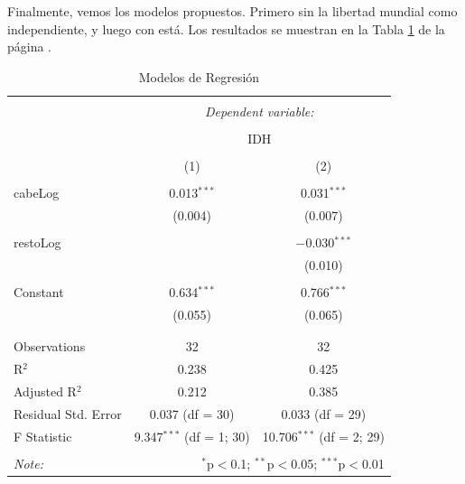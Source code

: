 \documentclass{article}
\begin{document}
Finalmente, vemos los modelos propuestos. Primero sin la libertad mundial como independiente, y luego con está. Los resultados se muestran en la Tabla \ref{regresiones} de la página \pageref{regresiones}.



\begin{table}[!htbp] \centering 
  \caption{Modelos de Regresión} 
  \label{regresiones} 
\begin{tabular}{@{\extracolsep{5pt}}lcc} 
\\[-1.8ex]\hline 
\hline \\[-1.8ex] 
 & \multicolumn{2}{c}{\textit{Dependent variable:}} \\ 
\cline{2-3} 
\\[-1.8ex] & \multicolumn{2}{c}{IDH} \\ 
\\[-1.8ex] & (1) & (2)\\ 
\hline \\[-1.8ex] 
 cabeLog & 0.013$^{***}$ & 0.031$^{***}$ \\ 
  & (0.004) & (0.007) \\ 
  & & \\ 
 restoLog &  & $-$0.030$^{***}$ \\ 
  &  & (0.010) \\ 
  & & \\ 
 Constant & 0.634$^{***}$ & 0.766$^{***}$ \\ 
  & (0.055) & (0.065) \\ 
  & & \\ 
\hline \\[-1.8ex] 
Observations & 32 & 32 \\ 
R$^{2}$ & 0.238 & 0.425 \\ 
Adjusted R$^{2}$ & 0.212 & 0.385 \\ 
Residual Std. Error & 0.037 (df = 30) & 0.033 (df = 29) \\ 
F Statistic & 9.347$^{***}$ (df = 1; 30) & 10.706$^{***}$ (df = 2; 29) \\ 
\hline 
\hline \\[-1.8ex] 
\textit{Note:}  & \multicolumn{2}{r}{$^{*}$p$<$0.1; $^{**}$p$<$0.05; $^{***}$p$<$0.01} \\ 
\end{tabular} 
\end{table} 
\clearpage
\end{document}
